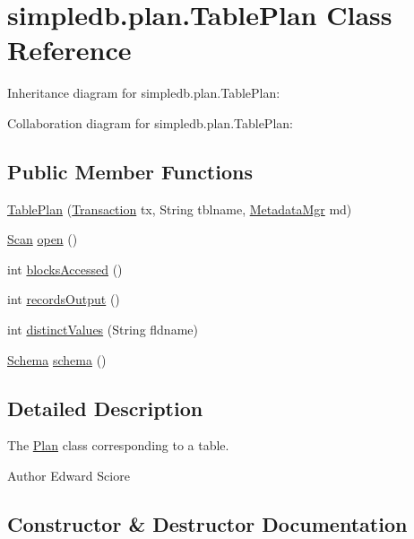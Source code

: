 \hypertarget{classsimpledb_1_1plan_1_1TablePlan}{}\section{simpledb.\+plan.\+Table\+Plan Class Reference}
\label{classsimpledb_1_1plan_1_1TablePlan}


Inheritance diagram for simpledb.\+plan.\+Table\+Plan\+:


Collaboration diagram for simpledb.\+plan.\+Table\+Plan\+:
\subsection*{Public Member Functions}
\begin{DoxyCompactItemize}
\item 
\hyperlink{classsimpledb_1_1plan_1_1TablePlan_ad381b52fcfe92f8147a5046bfb6d5690}{Table\+Plan} (\hyperlink{classsimpledb_1_1tx_1_1Transaction}{Transaction} tx, String tblname, \hyperlink{classsimpledb_1_1metadata_1_1MetadataMgr}{Metadata\+Mgr} md)
\item 
\hyperlink{interfacesimpledb_1_1query_1_1Scan}{Scan} \hyperlink{classsimpledb_1_1plan_1_1TablePlan_afb47e9016581a59788ec4de4c672cf76}{open} ()
\item 
int \hyperlink{classsimpledb_1_1plan_1_1TablePlan_a02096e40476829aa8df6de4519bfee33}{blocks\+Accessed} ()
\item 
int \hyperlink{classsimpledb_1_1plan_1_1TablePlan_ab55d872332c11cd882240f8b1851abc6}{records\+Output} ()
\item 
int \hyperlink{classsimpledb_1_1plan_1_1TablePlan_a07271b00072ebfcc314da8f4be7a93f4}{distinct\+Values} (String fldname)
\item 
\hyperlink{classsimpledb_1_1record_1_1Schema}{Schema} \hyperlink{classsimpledb_1_1plan_1_1TablePlan_aeceae838a8fdc6dedfd23e8175374510}{schema} ()
\end{DoxyCompactItemize}


\subsection{Detailed Description}
The \hyperlink{interfacesimpledb_1_1plan_1_1Plan}{Plan} class corresponding to a table. \begin{DoxyAuthor}{Author}
Edward Sciore 
\end{DoxyAuthor}


\subsection{Constructor \& Destructor Documentation}
\mbox{\label{classsimpledb_1_1plan_1_1TablePlan_ad381b52fcfe92f8147a5046bfb6d5690}} 
